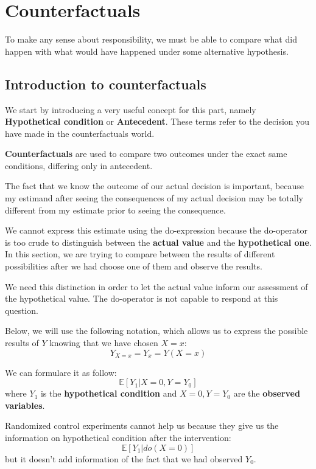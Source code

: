 \chapter{Counterfactuals}
To make any sense about responsibility, we must be able to compare what did happen
with what would have happened under some alternative hypothesis.
\section{Introduction to counterfactuals}
We start by introducing a very useful concept for this part, namely \textbf{Hypothetical
    condition} or \textbf{Antecedent}.  These terms refer to the decision you
have made in the counterfactuals world.

\textbf{Counterfactuals} are used to compare two outcomes under the exact same
conditions, differing only in antecedent.

The fact that we know the outcome of our actual decision is important, because
my estimand after seeing the consequences of my actual decision may be totally
different from my estimate prior to seeing the consequence.

We cannot express this estimate using the do-expression because the do-operator
is too crude to distinguish between the \textbf{actual value} and the
\textbf{hypothetical one}. In this section, we are trying to compare between the
results of different possibilities after we had choose one of them and observe
the results.

We need this distinction in order to let the actual value inform our assessment
of the hypothetical value. The do-operator is not capable to respond at this question.

Below, we will use the following notation, which allows us to express the possible
results of $Y$ knowing that we have chosen $X = x$:
\begin{equation*}
    Y_{X = x} = Y_x = Y(X = x)
\end{equation*}

We can formulare it as follow:
\begin{equation*}
    \mathbb{E}[Y_1 | X = 0, Y = Y_0]
\end{equation*}
where $Y_1$ is the \textbf{hypothetical condition} and $X = 0,Y = Y_0$ are the
\textbf{observed variables}.

\begin{note}
    Randomized control experiments cannot help us because they give us the information
    on hypothetical condition after the intervention:
    \begin{equation*}
        \mathbb{E}[Y_1 | do(X = 0)]
    \end{equation*}
    but it doesn't add information of the fact that we had observed $Y_0$.
\end{note}

